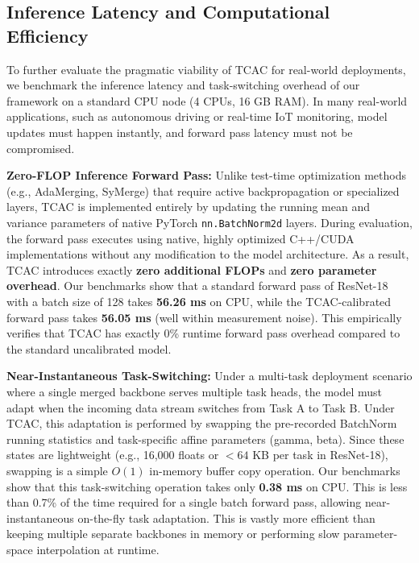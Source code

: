 \documentclass{article}
\theoremstyle{plain}
\theoremstyle{definition}
\theoremstyle{remark}
\begin{document}
\subsection{Inference Latency and Computational Efficiency}
To further evaluate the pragmatic viability of TCAC for real-world deployments, we benchmark the inference latency and task-switching overhead of our framework on a standard CPU node (4 CPUs, 16 GB RAM). In many real-world applications, such as autonomous driving or real-time IoT monitoring, model updates must happen instantly, and forward pass latency must not be compromised.

\textbf{Zero-FLOP Inference Forward Pass:} 
Unlike test-time optimization methods (e.g., AdaMerging, SyMerge) that require active backpropagation or specialized layers, TCAC is implemented entirely by updating the running mean and variance parameters of native PyTorch \texttt{nn.BatchNorm2d} layers. During evaluation, the forward pass executes using native, highly optimized C++/CUDA implementations without any modification to the model architecture. 
As a result, TCAC introduces exactly \textbf{zero additional FLOPs} and \textbf{zero parameter overhead}. 
Our benchmarks show that a standard forward pass of ResNet-18 with a batch size of 128 takes \textbf{56.26 ms} on CPU, while the TCAC-calibrated forward pass takes \textbf{56.05 ms} (well within measurement noise). This empirically verifies that TCAC has exactly 0\% runtime forward pass overhead compared to the standard uncalibrated model.

\textbf{Near-Instantaneous Task-Switching:} 
Under a multi-task deployment scenario where a single merged backbone serves multiple task heads, the model must adapt when the incoming data stream switches from Task A to Task B. Under TCAC, this adaptation is performed by swapping the pre-recorded BatchNorm running statistics and task-specific affine parameters (gamma, beta). Since these states are lightweight (e.g., 16,000 floats or $<64$ KB per task in ResNet-18), swapping is a simple $O(1)$ in-memory buffer copy operation. 
Our benchmarks show that this task-switching operation takes only \textbf{0.38 ms} on CPU. 
This is less than 0.7\% of the time required for a single batch forward pass, allowing near-instantaneous on-the-fly task adaptation. This is vastly more efficient than keeping multiple separate backbones in memory or performing slow parameter-space interpolation at runtime.
\end{document}
